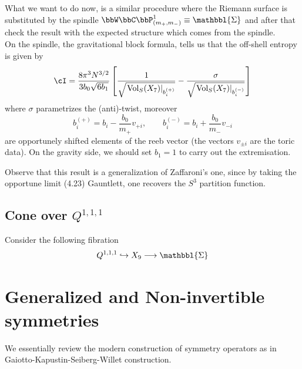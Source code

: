 \documentclass[11pt]{article}
\theoremstyle{definition}
\numberwithin{equation}{section}
\newcommand{\Spindle}{\mathbbl{\Sigma}}
\begin{document}
What we want to do now, is a similar procedure where the Riemann surface is substituted by the spindle $\bbW\bbC\bbP^{1}_{(m_{+},m_{-})}\equiv\Spindle$ and after that check the result with the expected structure which comes from the spindle.\\
On the spindle, the gravitational block formula, tells us that the off-shell entropy is given by
\begin{equation}
	\cI=\frac{8\pi^{3} N^{3/2}}{3b_{0}\sqrt{6b_{1}}}\left[\frac{1}{\sqrt{\left.\text{Vol}_{S}(X_{7})\right|_{b_{i}^{(+)}}}}-\frac{\sigma}{\sqrt{\left.\text{Vol}_{S}(X_{7})\right|_{b_{i}^{(-)}}}}\right]
\end{equation}
where $\sigma$ parametrizes the (anti)-twist, moreover
\begin{equation}
	b_{i}^{(+)}=b_{i}-\frac{b_{0}}{m_{+}}v_{+i},\qquad b_{i}^{(-)}=b_{i}+\frac{b_{0}}{m_{-}}v_{-i}
\end{equation}
are opportunely shifted elements of the reeb vector (the vectors $v_{\pm i}$ are the toric data). On the gravity side, we should set $b_{1}=1$ to carry out the extremisation.

Observe that this result is a generalization of Zaffaroni's one, since by taking the opportune limit (4.23) Gauntlett, one recovers the $S^{3}$ partition function.

\subsection{Cone over $Q^{1,1,1}$}
Consider the following fibration
\begin{equation}
	Q^{1,1,1}\hookrightarrow X_{9}\longrightarrow\Spindle
\end{equation}

\section{Generalized and Non-invertible symmetries}
We essentially review the modern construction of symmetry operators as in Gaiotto-Kapustin-Seiberg-Willet construction.
\end{document}
